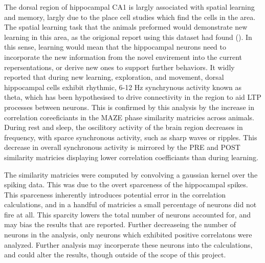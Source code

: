 \documentclass[9pt,twocolumn,twoside,lineno]{pnas-new}
\begin{document}
The dorsal region of hippocampal CA1 is largly associated with spatial learning and memory, largly due to the place cell studies which find the cells in the area. The spatial learning task that the animals preformed would demonstrate new learning in this area, as the origional report using this dataset had found (). In this sense, learning would mean that the hippocampal neurons need to incorporate the new information from the novel envirement into the current repersentations, or derive new ones to support further behaviors. It widly reported that during new learning, exploration, and movement, dorsal hippocampal cells exhibit rhythmic, 6-12 Hz synchrynous activity known as theta, which has been hypothesised to drive connectivity in the region to aid LTP processes between neurons. This is confirmed by this analysis by the increase in correlation coreeficiants in the MAZE phase similarity matricies across animals. During rest and sleep, the oscilitory activity of the brain region decreases in frequency, with sparce synchronous activity, such as sharp waves or ripples. This decrease in overall synchronous activity is mirrored by the PRE and POST similarity matricies displaying lower correlation coefficiants than during learning. 

The similarity matricies were computed by convolving a gaussian kernel over the spiking data. This was due to the overt sparceness of the hippocampal spikes. This sparceness inherently introduces potential error in the correlation calculations, and in a handful of matricies a small percentage of neurons did not fire at all. This sparcity lowers the total number of neurons accounted for, and may bias the results that are reported. Further decreaseing the number of neurons in the analysis, only neurons which exhibited positive correlatons were analyzed. Further analysis may incorperate these neurons into the calculations, and could alter the results, though outside of the scope of this project. 
\end{document}
